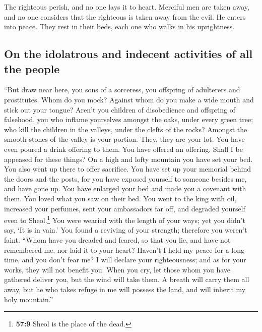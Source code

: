  The righteous perish, and no one lays it to heart.
Merciful men are taken away, and no one considers that the righteous is
taken away from the evil.  He enters into peace. They rest
in their beds, each one who walks in his uprightness.

\hypertarget{on-the-idolatrous-and-indecent-activities-of-all-the-people}{%
\subsection{On the idolatrous and indecent activities of all the
people}\label{on-the-idolatrous-and-indecent-activities-of-all-the-people}}

 ``But draw near here, you sons of a sorceress, you
offspring of adulterers and prostitutes.  Whom do you
mock? Against whom do you make a wide mouth and stick out your tongue?
Aren't you children of disobedience and offspring of falsehood,
 you who inflame yourselves amongst the oaks, under every
green tree; who kill the children in the valleys, under the clefts of
the rocks?  Amongst the smooth stones of the valley is
your portion. They, they are your lot. You have even poured a drink
offering to them. You have offered an offering. Shall I be appeased for
these things?  On a high and lofty mountain you have set
your bed. You also went up there to offer sacrifice.  You
have set up your memorial behind the doors and the posts, for you have
exposed yourself to someone besides me, and have gone up. You have
enlarged your bed and made you a covenant with them. You loved what you
saw on their bed.  You went to the king with oil,
increased your perfumes, sent your ambassadors far off, and degraded
yourself even to Sheol.\footnote{\textbf{57:9} Sheol is the place of the
  dead.}  You were wearied with the length of your ways;
yet you didn't say, `It is in vain.' You found a reviving of your
strength; therefore you weren't faint.  ``Whom have you
dreaded and feared, so that you lie, and have not remembered me, nor
laid it to your heart? Haven't I held my peace for a long time, and you
don't fear me?  I will declare your righteousness; and as
for your works, they will not benefit you.  When you cry,
let those whom you have gathered deliver you, but the wind will take
them. A breath will carry them all away, but he who takes refuge in me
will possess the land, and will inherit my holy mountain.''

